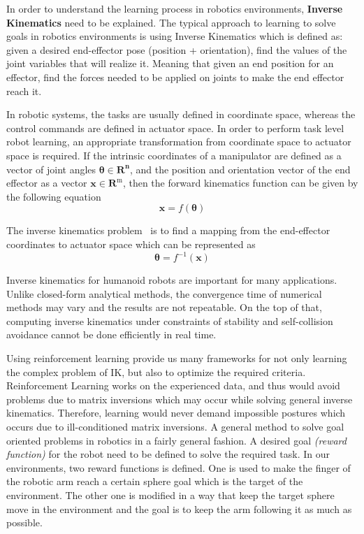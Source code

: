 In order to understand the learning process in robotics environments, \textbf{Inverse Kinematics} need to be explained. The typical approach to learning to solve goals in robotics environments is using Inverse Kinematics which is defined as: given a desired end-effector pose (position + orientation), find the values of the joint variables that will realize it. Meaning that given an end position for an effector, find the forces needed to be applied on joints to make the end effector reach it.

In robotic systems, the tasks are usually defined in coordinate space, whereas the control commands are defined in actuator space. In order to perform task level robot learning, an appropriate transformation from coordinate space to actuator space is required. If the intrinsic coordinates of a manipulator are defined as a vector of joint angles \(\boldsymbol{\theta} \in \mathbf{R}^{\mathbf{n}}\), and the position and orientation vector of the end effector as a vector \(\mathbf{x} \in \mathbf{R}^{\mathrm{m}}\), then the forward kinematics function can be given by the following equation 
\begin{equation}
		\mathbf{x}=f(\boldsymbol{\theta})
\end{equation}

The inverse kinematics problem~\parencite{colome2011smooth, chua2013robust} is to find a mapping from the end-effector coordinates to actuator space which can be represented as
\begin{equation}
		\boldsymbol{\theta}=f^{-1}(\mathbf{x})
\end{equation}

Inverse kinematics for humanoid robots are important for many applications. Unlike closed-form analytical methods, the convergence time of numerical methods may vary and the results are not repeatable. On the top of that, computing inverse kinematics under constraints of stability and self-collision avoidance cannot be done efficiently in real time.

Using reinforcement learning provide us many frameworks for not only learning the complex problem of IK, but also to optimize the required criteria. Reinforcement Learning works on the experienced data, and thus would avoid problems due to matrix inversions which may occur while solving general inverse kinematics. Therefore, learning would never demand impossible postures which occurs due to ill-conditioned matrix inversions. A general method to solve goal oriented problems in robotics in a fairly general fashion. A desired goal \textit{(reward function)} for the robot need to be defined to solve the required task. In our environments, two reward functions is defined. One is used to make the finger of the robotic arm reach a certain sphere goal which is the target of the environment. The other one is modified in a way that keep the target sphere move in the environment and the goal is to keep the arm following it as much as possible. 



